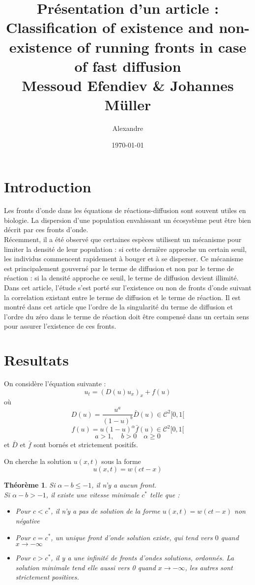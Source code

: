 \documentclass{article}
\title{Pr\'esentation d'un article : \\ Classification of existence and non-existence of running fronts in case of fast diffusion\\\small{Messoud Efendiev \& Johannes M\"uller}}
\author{Alexandre \bsc{Vieira}}
\date{\today}
\newtheorem{theorem}{Théorème}[subsection]
\begin{document}
\maketitle
\tableofcontents

\newpage

\section*{Introduction}
Les fronts d'onde dans les équations de réactions-diffusion sont souvent utiles en biologie. La dispersion d'une population envahissant un écosystème peut être bien décrit par ces fronts d'onde.\\
Récemment, il a été observé que certaines espèces utilisent un mécanisme pour limiter la densité de leur population : si cette dernière approche un certain seuil, les individus commencent rapidement à bouger et à se disperser. Ce mécanisme est principalement gouverné par le terme de diffusion et non par le terme de réaction : si la densité approche ce seuil, le terme de diffusion devient illimité. \\
Dans cet article, l'étude s'est porté sur l'existence ou non de fronts d'onde suivant la correlation existant entre le terme de diffusion et le terme de réaction. Il est montré dans cet article que l'ordre de la singularité du terme de diffusion et l'ordre du zéro dans le terme de réaction doit être compensé dans un certain sens pour assurer l'existence de ces fronts.

\section{Resultats}
On considère l'équation suivante :
	\begin{equation} \label{eqnG} u_t=(D(u)u_x)_x + f(u)\end{equation}
où
	\[D(u)=\frac{u^a}{(1-u)^b}\bar{D}(u)\in\mathcal{C}^2[0,1[\]
	\[f(u)=u(1-u)^\alpha \bar{f}(u)\in\mathcal{C}^2[0,1[\]
	\[a>1,\hspace{1em} b>0 \hspace{1em} \alpha\geq 0\]
et $\bar{D}$ et $\bar{f}$ sont bornés et strictement positifs.

\bigskip
	On cherche la solution $u(x,t)$ sous la forme \[u(x,t)=w(ct-x)\]

\begin{theorem}
Si $\alpha-b\leq -1$, il n'y a aucun front.\\
	Si $\alpha-b>-1$, il existe une vitesse minimale $c^*$ telle que :
	\begin{itemize}
		\item Pour $c<c^*$, il n'y a pas de solution de la forme $u(x,t)=w(ct-x)$ non négative
		\item Pour $c=c^*$, un unique front d'onde solution existe, qui tend vers $0$ quand $x\to-\infty$
		\item Pour $c>c^*$, il y a une infinité de fronts d'ondes solutions, ordonnés. La solution minimale tend elle aussi vers 0 quand $x\to -\infty$, les autres sont strictement positives.
	\end{itemize}
\end{theorem}
\end{document}
